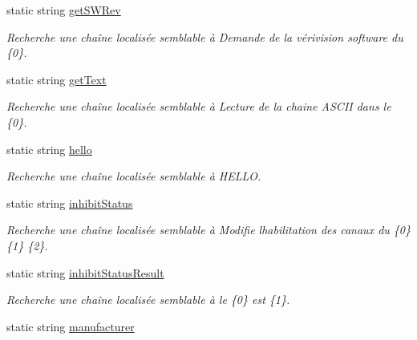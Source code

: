 \begin{DoxyCompactItemize}
static string \mbox{\hyperlink{class_device_library_1_1messages_text_a57d987d8f74d2176c72e5f6e29b42fc2}{get\+S\+W\+Rev}}
\begin{DoxyCompactList}\small\item\em Recherche une chaîne localisée semblable à Demande de la vérivision software du \{0\}. \end{DoxyCompactList}\item 
static string \mbox{\hyperlink{class_device_library_1_1messages_text_a41967611d2c8b9d237599dd156a13dd8}{get\+Text}}
\begin{DoxyCompactList}\small\item\em Recherche une chaîne localisée semblable à Lecture de la chaine A\+S\+C\+II dans le \{0\}. \end{DoxyCompactList}\item 
static string \mbox{\hyperlink{class_device_library_1_1messages_text_a4e9189c04771bbd6e96ba7f9d5d515fc}{hello}}
\begin{DoxyCompactList}\small\item\em Recherche une chaîne localisée semblable à H\+E\+L\+LO. \end{DoxyCompactList}\item 
static string \mbox{\hyperlink{class_device_library_1_1messages_text_a4beee20720447145e0de98bb1cf44e66}{inhibit\+Status}}
\begin{DoxyCompactList}\small\item\em Recherche une chaîne localisée semblable à Modifie l\textquotesingle{}habilitation des canaux du \{0\} \{1\} \{2\}. \end{DoxyCompactList}\item 
static string \mbox{\hyperlink{class_device_library_1_1messages_text_ac37e35f9f795175e6dca7d0b49b33637}{inhibit\+Status\+Result}}
\begin{DoxyCompactList}\small\item\em Recherche une chaîne localisée semblable à le \{0\} est \{1\}. \end{DoxyCompactList}\item 
static string \mbox{\hyperlink{class_device_library_1_1messages_text_a2f62050bea514c3f25710deb511535dc}{manufacturer}}

\end{DoxyCompactItemize}

